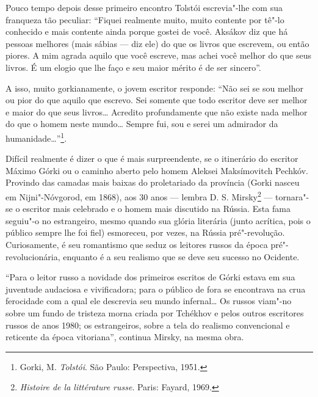 {{Pouco tempo depois desse primeiro encontro Tolstói escrevia"-lhe com sua
franqueza tão peculiar: ``Fiquei realmente muito, muito contente por
tê"-lo conhecido e mais contente ainda porque gostei de você. Aksákov diz
que há pessoas melhores (mais sábias --- diz ele) do que os livros que
escrevem, ou então piores. A mim agrada aquilo que você escreve, mas
achei você melhor do que seus livros. É um elogio que lhe faço e seu
maior mérito é de ser sincero''.

A isso, muito gorkianamente, o jovem escritor responde: ``Não sei se sou
melhor ou pior do que aquilo que escrevo. Sei somente que todo escritor
deve ser melhor e maior do que seus livros\ldots{} Acredito profundamente que
não existe nada melhor do que o homem neste mundo\ldots{} Sempre fui, sou e
serei um admirador da humanidade\ldots{}''\footnote{Gorki, M. \emph{Tolstói}. São Paulo: Perspectiva, 1951.}.

Difícil realmente é dizer o que é mais surpreendente, se o itinerário do
escritor Máximo Górki ou o caminho aberto pelo homem Aleksei
Maksímovitch Pechkóv. Provindo das camadas mais baixas do proletariado
da província (Gorki nasceu em Nijni"-Nóvgorod, em 1868), aos 30 anos --- lembra
D. S. Mirsky\footnote{\emph{Histoire de la littérature russe}. Paris: Fayard, 1969.} --- tornara"-se o
escritor mais celebrado e o homem mais discutido na Rússia. Esta fama
seguiu"-o no estrangeiro, mesmo quando sua glória literária (junto
acrítica, pois o público sempre lhe foi fiel) esmoreceu, por vezes, na
Rússia pré"-revolução. Curiosamente, é seu romantismo que seduz os
leitores russos da época pré"-revolucionária, enquanto é a seu realismo
que se deve seu sucesso no Ocidente.

``Para o leitor russo a novidade dos primeiros escritos de Górki estava
em sua juventude audaciosa e vivificadora; para o público de fora se
encontrava na crua ferocidade com a qual ele descrevia seu mundo
infernal\ldots{} Os russos viam"-no sobre um fundo de tristeza morna criada
por Tchékhov e pelos outros escritores russos de anos 1980; os
estrangeiros, sobre a tela do realismo convencional e reticente da época
vitoriana'', continua Mirsky, na mesma obra.

}}
